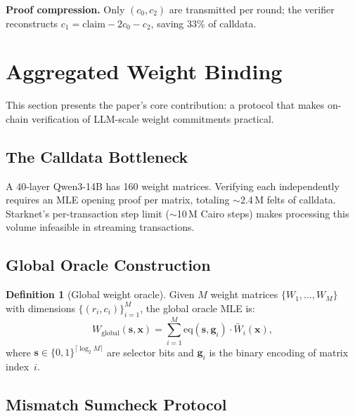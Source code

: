 \documentclass[10pt,twocolumn]{article}
\theoremstyle{definition}
\newtheorem{definition}[theorem]{Definition}
\theoremstyle{remark}
\newcommand{\eq}{\mathrm{eq}}
\newcommand{\MLE}{\widetilde}
\begin{document}
\textbf{Proof compression.}
Only $(c_0,c_2)$ are transmitted per round; the verifier reconstructs
$c_1 = \text{claim} - 2c_0 - c_2$, saving 33\% of calldata.


\section{Aggregated Weight Binding}\label{sec:binding}

This section presents the paper's core contribution: a protocol that
makes on-chain verification of LLM-scale weight commitments practical.

\subsection{The Calldata Bottleneck}

A 40-layer Qwen3-14B has 160 weight matrices.
Verifying each independently requires an MLE opening proof per matrix,
totaling $\sim$2.4\,M felts of calldata.
Starknet's per-transaction step limit ($\sim$10\,M Cairo steps) makes
processing this volume infeasible in streaming transactions.

\subsection{Global Oracle Construction}

\begin{definition}[Global weight oracle]\label{def:global-oracle}
  Given $M$ weight matrices $\{W_1,\ldots,W_M\}$ with dimensions
  $\{(r_i,c_i)\}_{i=1}^M$, the global oracle MLE is:
  \begin{equation}\label{eq:global}
    W_{\text{global}}(\mathbf{s},\mathbf{x})
    = \sum_{i=1}^{M} \eq(\mathbf{s},\mathbf{g}_i)
      \cdot \MLE{W_i}(\mathbf{x}),
  \end{equation}
  where $\mathbf{s}\in\{0,1\}^{\lceil\log_2 M\rceil}$ are selector bits
  and $\mathbf{g}_i$ is the binary encoding of matrix index~$i$.
\end{definition}

\subsection{Mismatch Sumcheck Protocol}
\end{document}

